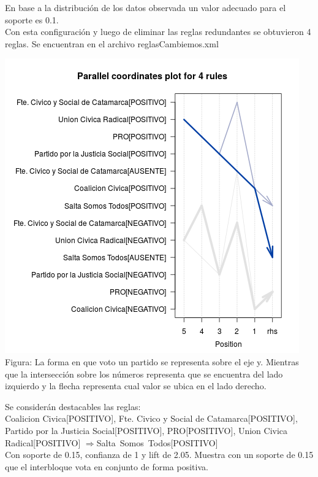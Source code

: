 \documentclass{endm}
\begin{document}
En base a la distribución de los datos observada un valor adecuado para el soporte es 0.1.\\

Con esta configuración y luego de eliminar las reglas redundantes se obtuvieron 4 reglas. Se encuentran en el archivo reglasCambiemos.xml  \\

\begin{center}
\includegraphics[scale=0.4]{graficos/paracoordInterbloquesCambiemos.png} \\
\scriptsize{Figura: La forma en que voto un partido se representa sobre el eje y. Mientras que la intersección sobre  los números representa que se encuentra del lado izquierdo y la flecha representa cual valor se ubica en el lado derecho.}
\end{center}

Se considerán destacables las reglas: \\

{Coalicion Civica[POSITIVO],
 Fte. Civico y Social de Catamarca[POSITIVO],
 Partido por la Justicia Social[POSITIVO],   
 PRO[POSITIVO], Union Civica Radical[POSITIVO]} $\Longrightarrow${Salta\ Somos\ Todos[POSITIVO]} \\

Con soporte de 0.15, confianza de 1 y lift de 2.05. Muestra  con un soporte de 0.15 que el interbloque vota en conjunto de forma positiva. \\
\end{document}
